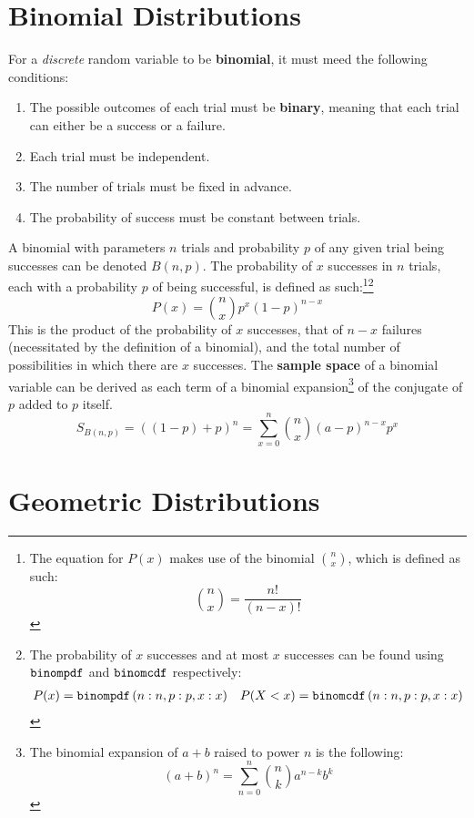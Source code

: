 \documentclass[../AP_Statistics.tex]{subfiles}
\begin{document}
		\section{Binomial Distributions}
			For a \emph{discrete} random variable to be \textbf{binomial}, it must meed the following conditions:
			\begin{enumerate}
				\item
					The possible outcomes of each trial must be \textbf{binary}, meaning that each trial can either be a success or a failure.
				\item
					Each trial must be independent.
				\item
					The number of trials must be fixed in advance.
				\item
					The probability of success must be constant between trials.
			\end{enumerate}
			A binomial with parameters $n$ trials and probability $p$ of any given trial being successes can be denoted $B(n, p)$.
			The probability of $x$ successes in $n$ trials, each with a probability $p$ of being successful, is defined as such:\footnote{The equation for $P(x)$ makes use of the binomial $\binom{n}{x}$, which is defined as such:$$\binom{n}{x} = \frac{n!}{(n - x)!}$$}\footnote{The probability of $x$ successes and at most $x$ successes can be found using $\operatorname{\texttt{binompdf}}$ and $\operatorname{\texttt{binomcdf}}$ respectively:\begin{align*}P(x) = \operatorname{\texttt{binompdf}}\left(n:n, p:p, x:x\right) && P(X < x) = \operatorname{\texttt{binomcdf}}\left(n:n, p:p, x:x\right)\end{align*}}
			$$P(x) = \binom{n}{x}p^x(1 - p)^{n - x}$$
			This is the product of the probability of $x$ successes, that of $n - x$ failures (necessitated by the definition of a binomial), and the total number of possibilities in which there are $x$ successes.
			The \textbf{sample space} of a binomial variable can be derived as each term of a binomial expansion\footnote{The binomial expansion of $a + b$ raised to power $n$ is the following:$$(a + b)^n = \sum_{n = 0}^n\binom{n}{k}a^{n - k}b^k$$} of the conjugate of $p$ added to $p$ itself.
			$$S_{B(n, p)} = ((1 - p) + p)^n = \sum_{x = 0}^n\binom{n}{x}(a - p)^{n - x}p^x$$
		\section{Geometric Distributions}
\end{document}
